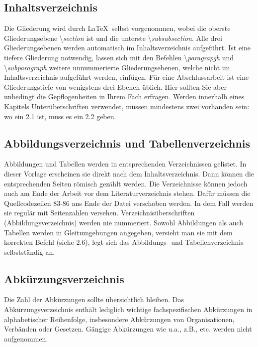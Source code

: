 \documentclass[a4paper,11pt]{article}%
\renewcommand{\\}{\vspace*{0.5\baselineskip} \newline}
\begin{document}
\subsection{Inhaltsverzeichnis}
Die Gliederung wird durch \LaTeX~selbst vorgenommen, wobei die oberste Gliederungsebene \textbackslash\textit{section} ist und die unterste \textbackslash\textit{subsubsection}. Alle drei Gliederungsebenen werden automatisch im Inhaltsverzeichnis aufgeführt. \\
Ist eine tiefere Gliederung notwendig, lassen sich mit den Befehlen \textbackslash\textit{paragrapgh} und \textbackslash\textit{subparagraph} weitere unnummerierte Gliederungsebenen, welche nicht im Inhaltsverzeichnis aufgeführt werden, einfügen.\\
Für eine Abschlussarbeit ist eine Gliederungstiefe von wenigstens drei Ebenen üblich. Hier sollten Sie aber unbedingt die Gepflogenheiten in Ihrem Fach erfragen.\\
Werden innerhalb eines Kapitels Unterüberschriften verwendet, müssen mindestens zwei vorhanden sein: wo ein 2.1 ist, muss es ein 2.2 geben.

\subsection{Abbildungsverzeichnis und Tabellenverzeichnis}
Abbildungen und Tabellen werden in entsprechenden Verzeichnissen gelistet. In dieser Vorlage erscheinen sie direkt nach dem Inhaltsverzeichnis. Dann können die entsprechenden Seiten römisch gezählt werden. Die Verzeichnisse können jedoch auch am Ende der Arbeit vor dem Literaturverzeichnis stehen. Dafür müssen die Quellcodezeilen 83-86 ans Ende der Datei verschoben werden. In dem Fall werden sie regulär mit Seitenzahlen versehen. Verzeichnisüberschriften (Abbildungsverzeichnis) werden nie nummeriert. \\
Sowohl Abbildungen als auch Tabellen werden in Gleitumgebungen angegeben, versieht man sie mit dem korrekten Befehl (siehe 2.6), legt sich das Abbildungs- und Tabellenverzeichnis selbstständig an. 

\subsection{Abkürzungsverzeichnis}
Die Zahl der Abkürzungen sollte übersichtlich bleiben. Das Abkürzungsverzeichnis enthält lediglich wichtige fachspezifischen Abkürzungen in alphabetischer Reihenfolge, insbesondere Abkürzungen von Organisationen, Verbänden oder Gesetzen. Gängige Abkürzungen wie u.a., z.B., etc. werden nicht aufgenommen.
\end{document}
